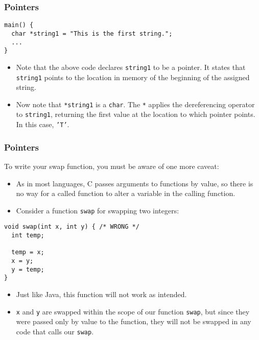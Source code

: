 \documentclass[pdf]{beamer}
\begin{document}
\begin{frame}[fragile]
  \frametitle{Pointers}

\begin{verbatim}
main() {
  char *string1 = "This is the first string.";
  ...
}
\end{verbatim}

  \begin{itemize}
  \item Note that the above code declares \texttt{string1} to be a
    pointer. It states that \texttt{string1} points to the location in
    memory of the beginning of the assigned string. \pause
  \item Now note that \texttt{*string1} is a \texttt{char}. The
    \texttt{*} applies the dereferencing operator to
    \texttt{string1}, returning the first value at the location to which
    pointer points. In this case, \texttt{'T'}.
  \end{itemize}

\end{frame}

\begin{frame}[fragile]
  \frametitle{Pointers}


  To write your swap function, you must be aware of one more caveat:
  \begin{itemize}
  \item As in most languages, C passes arguments to functions by value, so there
    is no way for a called function to alter a variable in the calling function.
    \pause
  \item Consider a function \texttt{swap} for swapping two integers:
  \end{itemize}

\begin{verbatim}
void swap(int x, int y) { /* WRONG */
  int temp;

  temp = x;
  x = y;
  y = temp;
}
\end{verbatim}
\pause
  \begin{itemize}
  \item Just like Java, this function will not work as intended. \pause
  \item \texttt{x} and \texttt{y} are swapped within the scope of our
    function \texttt{swap}, but since they were passed only by value to
    the function, they will not be swapped in any code that calls our \texttt{swap}.
  \end{itemize}
\end{frame}
\end{document}
